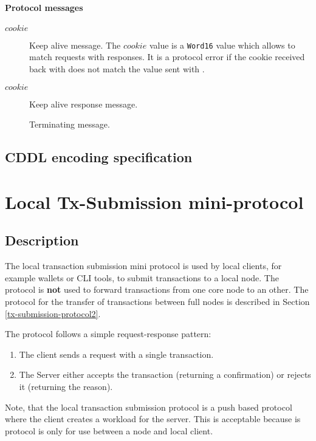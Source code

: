 \paragraph{Protocol messages}
\begin{description}
\item [\MsgKeepAlive{} $cookie$]
  Keep alive message.  The $cookie$ value is a \texttt{Word16} value which allows to
  match requests with responses.  It is a protocol error if the cookie received
  back with \MsgKeepAliveResponse{} does not match the value sent with
  \MsgKeepAlive{}.
\item [\MsgKeepAliveResponse{} $cookie$]
  Keep alive response message.
\item [\MsgDone]
  Terminating message.
\end{description}

\subsection{CDDL encoding specification}


\section{Local Tx-Submission mini-protocol}
\label{local-tx-submission-protocol}
\subsection{Description}
The local transaction submission mini protocol is used by local clients,
for example wallets or CLI tools, to submit transactions to a local node.
The protocol is {\bf not} used to forward transactions from one core node to an other.
The protocol for the transfer of transactions between full nodes
is described in Section \ref{tx-submission-protocol2}.

The protocol follows a simple request-response pattern:
\begin{enumerate}
\item The client sends a request with a single transaction.
\item The Server either accepts the transaction (returning a confirmation) or rejects it (returning the
  reason).
\end{enumerate}
Note, that the local transaction submission protocol is a push based protocol where the client
creates a workload for the server.
This is acceptable because is protocol is only for use between a node and local client.
\newcommand{\MsgSubmitTx}{\trans{MsgSubmitTx}}
\newcommand{\MsgAcceptTx}{\trans{MsgAcceptTx}}
\newcommand{\MsgRejectTx}{\trans{MsgRejectTx}}
